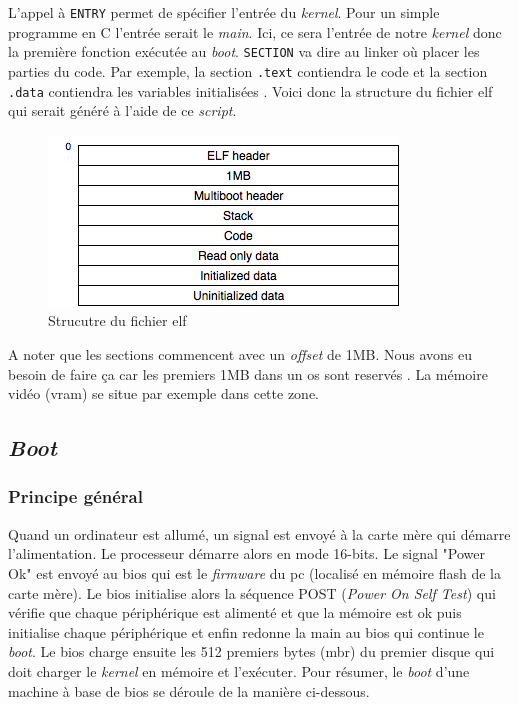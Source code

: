 L'appel à \texttt{ENTRY} permet de spécifier l'entrée du \textit{kernel}.
Pour un simple programme en C l'entrée serait le \textit{main}. Ici, ce sera
l'entrée de notre \textit{kernel} donc la première fonction exécutée au \textit{boot}.
\texttt{SECTION} va dire au linker où placer les parties du code. Par exemple, 
la section \texttt{.text} contiendra le code et la section \texttt{.data}
contiendra les variables initialisées \cite{ref42,ref9,ref10,ref11}. Voici donc la structure
du fichier \acrshort{elf} qui serait généré à l'aide de ce \textit{script}.

\begin{figure}[!h]
  \centering
  \includegraphics[scale=0.75]{images/elf_struct.png}
  \caption{Strucutre du fichier \acrshort{elf}}
\end{figure}

A noter que les sections commencent avec un \textit{offset} de 1MB. Nous avons eu
besoin de faire ça car les premiers 1MB dans un \acrshort{os} sont reservés \cite{ref42,ref13}.
La mémoire vidéo (\acrshort{vram}) se situe par exemple dans cette zone.


\subsection{\textit{Boot}}
\subsubsection{Principe général}
Quand un ordinateur est allumé, un signal est envoyé à la carte mère qui démarre
l'alimentation. Le processeur démarre alors en mode 16-bits. Le signal "Power Ok"
est envoyé au \acrshort{bios} qui est le \textit{firmware} du \acrshort{pc}
(localisé en mémoire flash de la carte mère). Le \acrshort{bios} initialise alors
la séquence POST (\textit{Power On Self Test}) qui vérifie que chaque périphérique
est alimenté et que la mémoire est ok puis initialise chaque périphérique et enfin
redonne la main au \acrshort{bios} qui continue le \textit{boot}. Le \acrshort{bios}
charge ensuite les 512 premiers bytes (\acrshort{mbr}) du premier disque qui doit
charger le \textit{kernel} en mémoire et l'exécuter. Pour résumer, le \textit{boot}
d'une machine à base de \acrshort{bios} se déroule de la manière ci-dessous.\cite{ref42}

